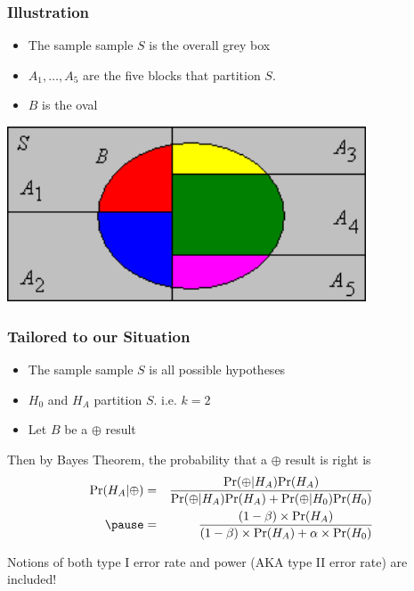 \documentclass[handout]{beamer}
\newcommand{\blue}[1]{\textcolor{blue2}{#1}}
\newcommand{\prob}{\mbox{Pr}}
\newcommand{\cp}{\oplus}
\begin{document}
\begin{frame}[fragile]
\frametitle{Illustration}

\begin{itemize}
\item The sample sample $S$ is the overall grey box
\item $A_1, \ldots, A_5$ are the five blocks that partition $S$.  
\item $B$ is the oval
\end{itemize}

\begin{center}
\includegraphics[width=0.8\textwidth]{figure/lotp.png} 
\end{center}

\end{frame}


\begin{frame}[fragile]
\frametitle{Tailored to our Situation}

%
%
\begin{itemize}
\item The sample sample $S$ is all possible hypotheses
\item $H_0$ and $H_A$ partition $S$.  i.e. $k=2$
\item Let $B$ be a $\cp$ result
\end{itemize}
\pause
Then by Bayes Theorem, the probability that a $\cp$ result is right is
\begin{eqnarray*}
\prob(H_A|\cp) &=& \frac{\prob(\cp|H_A)\prob(H_A)}{\prob(\cp|H_A)\prob(H_A) + \prob(\cp|H_0)\prob(H_0)} \\
\pause &=& \frac{(1-\beta)\times\prob(H_A)}{(1-\beta)\times\prob(H_A) + \alpha\times\prob(H_0)}\end{eqnarray*}

Notions of \blue{both} type I error rate and power (AKA type II error rate) are included!

\end{frame}
\end{document}
